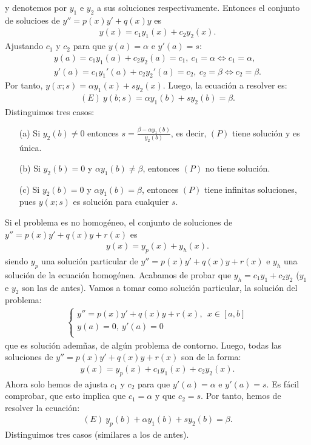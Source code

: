 y denotemos por $y_1$ e $y_2$ a sus soluciones respectivamente. Entonces el conjunto de solucioes de $y'' = p(x)y' + q(x)y$ es
\begin{align*}
    y(x) = c_1y_1(x) + c_2y_2(x).
\end{align*}
Ajustando $c_1$ y $c_2$ para que $y(a) = \alpha$ e $y'(a) = s$:
\begin{align*}
    y(a) = c_1y_1(a) + c_2y_2(a) = c_1, \ c_1 = \alpha\Longleftrightarrow c_1 = \alpha ,\\
    y'(a) = c_1y_1'(a) + c_2y_2'(a) = c_2,  \ c_2 = \beta\Longleftrightarrow c_2 = \beta .
\end{align*}
Por tanto, $y(x;s) = \alpha y_1(x) + sy_2(x)$. Luego, la ecuación a resolver es:
\begin{align*}
    (E) \ y(b;s) = \alpha y_1(b) + sy_2(b) = \beta.
\end{align*}
Distinguimos tres casos:
\begin{enumerate}
    \item[(a)] Si $y_2(b) \not = 0$ entonces $s = \frac{\beta - \alpha y_1(b)}{y_2(b)}$, es decir, $(P)$ tiene solución y es única.
    \item[(b)] Si $y_2(b) = 0$ y $\alpha y_1(b) \not = \beta$, entonces $(P)$ no tiene solución.
    \item[(c)] Si $y_2(b) = 0$ y $\alpha y_1(b)  = \beta$, entonces $(P)$ tiene infinitas soluciones, pues $y(x;s)$ es solución para cualquier $s$.
\end{enumerate}
Si el problema es no homogéneo, el conjunto de soluciones de $y'' = p(x)y' + q(x)y + r(x)$ es
\begin{align*}
    y(x) = y_p(x) + y_h(x).
\end{align*}
siendo $y_p$ una solución particular de $y'' = p(x)y' + q(x)y + r(x)$ e $y_h$ una solución de la ecuación homogénea. Acabamos de probar que $y_h = c_1y_1 + c_2y_2$ ($y_1$ e $y_2$ son las de antes). Vamos a tomar como solución particular, la solución del problema:
\begin{align*}
    \left\{ \begin{array}{lcc}
             y'' = p(x)y' + q(x)y + r(x), \ \ x \in [a,b]\\
             y(a) = 0, \ y'(a) = 0 \\
             \end{array}
   \right.
\end{align*}
que es solución ademñas, de algún problema de contorno. Luego, todas las soluciones de $y'' = p(x)y' + q(x)y + r(x)$ son de la forma:
\begin{align*}
    y(x) = y_p(x) + c_1y_1(x) + c_2y_2(x).
\end{align*}
Ahora solo hemos de ajusta $c_1$ y $c_2$ para que $y'(a) = \alpha$ e $y'(a) = s$. Es fácil comprobar, que esto implica que $c_1 = \alpha$ y que $c_2 = s$. Por tanto, hemos de resolver la ecuación:
\begin{align*}
    (E) \ y_p(b) + \alpha y_1(b) + s y_2(b) = \beta.
\end{align*}
Distinguimos tres casos (similares a los de antes).

